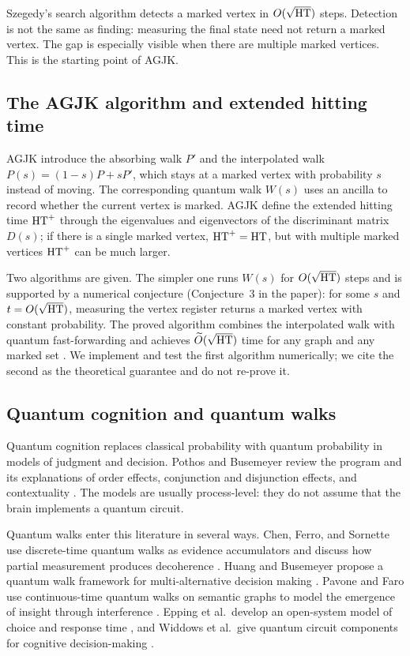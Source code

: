 Szegedy's search algorithm detects a marked vertex in
$O(\sqrt{\mathrm{HT}})$ steps. Detection is not the same as finding: measuring the
final state need not return a marked vertex. The gap is especially visible
when there are multiple marked vertices. This is the starting point of AGJK.

\subsection{The AGJK algorithm and extended hitting time}
\label{sec:background-agjk}

AGJK introduce the absorbing walk $P'$ and the interpolated walk
$P(s)=(1-s)P+sP'$, which stays at a marked vertex with probability $s$ instead
of moving. The corresponding quantum walk $W(s)$ uses an ancilla to record
whether the current vertex is marked. AGJK define the extended hitting time
$\mathrm{HT}^+$ through the eigenvalues and eigenvectors of the discriminant matrix
$D(s)$; if there is a single marked vertex, $\mathrm{HT}^+=\mathrm{HT}$, but with multiple
marked vertices $\mathrm{HT}^+$ can be much larger.

Two algorithms are given. The simpler one runs $W(s)$ for $O(\sqrt{\mathrm{HT}})$
steps and is supported by a numerical conjecture (Conjecture~3 in the paper):
for some $s$ and $t=O(\sqrt{\mathrm{HT}})$, measuring the vertex register returns a
marked vertex with constant probability. The proved algorithm combines the
interpolated walk with quantum fast-forwarding and achieves
$\widetilde O(\sqrt{\mathrm{HT}})$ time for any graph and any marked set
\citep{agjk2019}. We implement and test the first algorithm numerically; we
cite the second as the theoretical guarantee and do not re-prove it.

\subsection{Quantum cognition and quantum walks}
\label{sec:background-cognition}

Quantum cognition replaces classical probability with quantum probability in
models of judgment and decision. Pothos and Busemeyer review the program and
its explanations of order effects, conjunction and disjunction effects, and
contextuality \citep{pothos2022,busemeyer2024}. The models are usually
process-level: they do not assume that the brain implements a quantum circuit.

Quantum walks enter this literature in several ways. Chen, Ferro, and Sornette
use discrete-time quantum walks as evidence accumulators and discuss how
partial measurement produces decoherence \citep{chen2022}. Huang and Busemeyer
propose a quantum walk framework for multi-alternative decision making
\citep{huang2022}. Pavone and Faro use continuous-time quantum walks on
semantic graphs to model the emergence of insight through interference
\citep{pavone2025}. Epping et al.\ develop an open-system model of choice and
response time \citep{epping2023}, and Widdows et al.\ give quantum circuit
components for cognitive decision-making \citep{widdows2023}.


